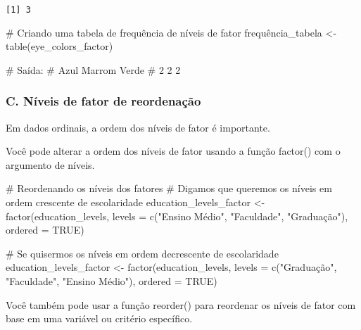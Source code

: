 \documentclass[
  letterpaper,
  DIV=11,
  numbers=noendperiod]{scrartcl}
\newenvironment{Shaded}{\begin{snugshade}}{\end{snugshade}}
\newcommand{\AttributeTok}[1]{\textcolor[rgb]{0.40,0.45,0.13}{#1}}
\newcommand{\CommentTok}[1]{\textcolor[rgb]{0.37,0.37,0.37}{#1}}
\newcommand{\ConstantTok}[1]{\textcolor[rgb]{0.56,0.35,0.01}{#1}}
\newcommand{\FunctionTok}[1]{\textcolor[rgb]{0.28,0.35,0.67}{#1}}
\newcommand{\NormalTok}[1]{\textcolor[rgb]{0.00,0.23,0.31}{#1}}
\newcommand{\OtherTok}[1]{\textcolor[rgb]{0.00,0.23,0.31}{#1}}
\newcommand{\StringTok}[1]{\textcolor[rgb]{0.13,0.47,0.30}{#1}}
\begin{document}
\begin{verbatim}
[1] 3
\end{verbatim}

\begin{Shaded}
\begin{Highlighting}[]
\CommentTok{\# Criando uma tabela de frequência de níveis de fator}
\NormalTok{frequência\_tabela }\OtherTok{\textless{}{-}} \FunctionTok{table}\NormalTok{(eye\_colors\_factor)}

\CommentTok{\# Saída:}
\CommentTok{\# Azul Marrom Verde}
\CommentTok{\# 2 2 2}
\end{Highlighting}
\end{Shaded}

\hypertarget{c.-nuxedveis-de-fator-de-reordenauxe7uxe3o}{%
\subsubsection{C. Níveis de fator de
reordenação}\label{c.-nuxedveis-de-fator-de-reordenauxe7uxe3o}}

Em dados ordinais, a ordem dos níveis de fator é importante.

Você pode alterar a ordem dos níveis de fator usando a função factor()
com o argumento de níveis.

\begin{Shaded}
\begin{Highlighting}[]
\CommentTok{\# Reordenando os níveis dos fatores}
\CommentTok{\# Digamos que queremos os níveis em ordem crescente de escolaridade}
\NormalTok{education\_levels\_factor }\OtherTok{\textless{}{-}} \FunctionTok{factor}\NormalTok{(education\_levels, }\AttributeTok{levels =} \FunctionTok{c}\NormalTok{(}\StringTok{"Ensino Médio"}\NormalTok{, }\StringTok{"Faculdade"}\NormalTok{, }\StringTok{"Graduação"}\NormalTok{), }\AttributeTok{ordered =} \ConstantTok{TRUE}\NormalTok{)}

\CommentTok{\# Se quisermos os níveis em ordem decrescente de escolaridade}
\NormalTok{education\_levels\_factor }\OtherTok{\textless{}{-}} \FunctionTok{factor}\NormalTok{(education\_levels, }\AttributeTok{levels =} \FunctionTok{c}\NormalTok{(}\StringTok{"Graduação"}\NormalTok{, }\StringTok{"Faculdade"}\NormalTok{, }\StringTok{"Ensino Médio"}\NormalTok{), }\AttributeTok{ordered =} \ConstantTok{TRUE}\NormalTok{)}
\end{Highlighting}
\end{Shaded}

Você também pode usar a função reorder() para reordenar os níveis de
fator com base em uma variável ou critério específico.
\end{document}
